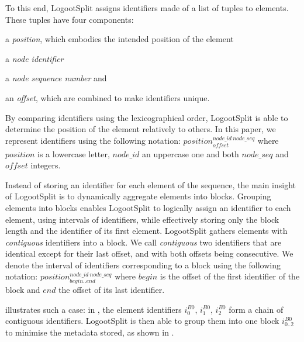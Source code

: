 \documentclass[10pt,journal,compsoc]{IEEEtran}
\newcommand{\trm}[1]{\mathit{#1}}
\newcommand{\id}[3]{$\trm{#1}^{\trm{#2}}_{\trm{#3}}$}
\begin{document}
To this end, LogootSplit assigns identifiers made of a list of tuples to elements.
These tuples have four components:
\begin{enumerate*}[label=(\roman*)]
    \item a \emph{position}, which embodies the intended position of the element
    \item a \emph{node identifier}
    \item a \emph{node sequence number} and
    \item an \emph{offset}, which are combined to make identifiers unique.
\end{enumerate*}
By comparing identifiers using the lexicographical order, LogootSplit is able to determine the position of the element relatively to others.
In this paper, we represent identifiers using the following notation: \id{position}{node\_id~node\_seq}{offset} where $\trm{position}$ is a lowercase letter, $\trm{node\_id}$ an uppercase one and both $\trm{node\_seq}$ and $\trm{offset}$ integers.

Instead of storing an identifier for each element of the sequence, the main insight of LogootSplit is to dynamically aggregate elements into blocks.
Grouping elements into blocks enables LogootSplit to logically assign an identifier to each element, using intervals of identifiers, while effectively storing only the block length and the identifier of its first element.
LogootSplit gathers elements with \emph{contiguous} identifiers into a block.
We call \emph{contiguous} two identifiers that are identical except for their last offset, and with both offsets being consecutive.
We denote the interval of identifiers corresponding to a block using the following notation: \id{position}{node\_id~node\_seq}{begin..end} where $\trm{begin}$ is the offset of the first identifier of the block and $\trm{end}$ the offset of its last identifier.

 illustrates such a case: in , the element identifiers \id{i}{B0}{0}, \id{i}{B0}{1}, \id{i}{B0}{2} form a chain of contiguous identifiers.
LogootSplit is then able to group them into one block \id{i}{B0}{0..2} to minimise the metadata stored, as shown in .
\end{document}
